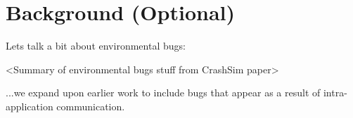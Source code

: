 \section{Background (Optional)}
\label{SEC:background}

Lets talk a bit about environmental bugs:

<Summary of environmental bugs stuff from CrashSim paper>


...we expand upon earlier work to include bugs that appear as a result of
intra-application communication.
